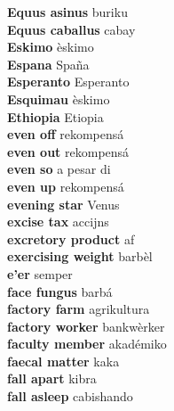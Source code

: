 \textbf{ Equus asinus  } buriku \\
\textbf{ Equus caballus  } cabay \\
\textbf{ Eskimo  } èskimo \\
\textbf{ Espana  } Spaña \\
\textbf{ Esperanto  } Esperanto \\
\textbf{ Esquimau  } èskimo \\
\textbf{ Ethiopia  } Etiopia \\
\textbf{ even off  } rekompensá \\
\textbf{ even out  } rekompensá \\
\textbf{ even so  } a pesar di \\
\textbf{ even up  } rekompensá \\
\textbf{ evening star  } Venus \\
\textbf{ excise tax  } accijns \\
\textbf{ excretory product  } af \\
\textbf{ exercising weight  } barbèl \\
\textbf{ e’er  } semper \\
\textbf{ face fungus  } barbá \\
\textbf{ factory farm  } agrikultura \\
\textbf{ factory worker  } bankwèrker \\
\textbf{ faculty member  } akadémiko \\
\textbf{ faecal matter  } kaka \\
\textbf{ fall apart  } kibra \\
\textbf{ fall asleep  } cabishando \\
